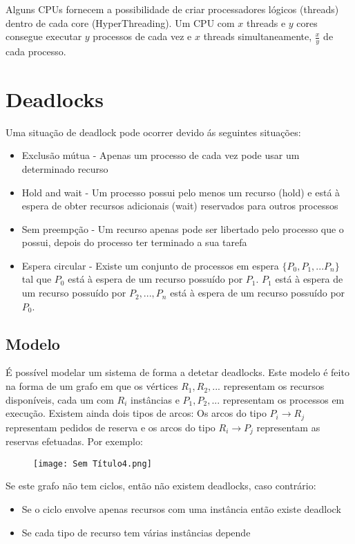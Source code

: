 \documentclass[10pt,a4paper]{report}
\begin{document}
Alguns CPUs fornecem a possibilidade de criar processadores lógicos (threads) dentro de cada core (HyperThreading). Um CPU com $x$ threads e $y$ cores consegue executar $y$ processos de cada vez e $x$ threads simultaneamente, $\frac{x}{y}$ de cada processo.
\section{Deadlocks}
Uma situação de deadlock pode ocorrer devido ás seguintes situações:
\begin{itemize}
\item Exclusão mútua - Apenas um processo de cada vez pode usar um determinado recurso
\item Hold and wait - Um processo possui pelo menos um recurso (hold) e está à espera de obter recursos adicionais (wait) reservados para outros processos
\item Sem preempção - Um recurso apenas pode ser libertado pelo processo que o possui, depois do processo ter terminado a sua tarefa
\item Espera circular - Existe um conjunto de processos em espera $\{P_0, P_1, ...P_n\}$ tal que $P_0$ está à espera de um recurso possuído por $P_1$. $P_1$ está à espera de um recurso possuído por $P_2, ..., P_n$ está à espera de um recurso possuído por $P_0$.
\end{itemize}
\subsection{Modelo}
É possível modelar um sistema de forma a detetar deadlocks. Este modelo é feito na forma de um grafo em que os vértices $R_1, R_2,...$ representam os recursos disponíveis, cada um com $R_i$ instâncias e $P_1, P_2,...$ representam os processos em execução. Existem ainda dois tipos de arcos: Os arcos do tipo $P_i \rightarrow R_j$ representam pedidos de reserva e os arcos do tipo $R_i \rightarrow P_j$ representam as reservas efetuadas. Por exemplo:
\begin{figure}[H]
\centering
\texttt{[image: Sem Título4.png]}
\end{figure}
Se este grafo não tem ciclos, então não existem deadlocks, caso contrário:
\begin{itemize}
\item Se o ciclo envolve apenas recursos com uma instância então existe deadlock
\item Se cada tipo de recurso tem várias instâncias depende
\end{itemize}
\end{document}
